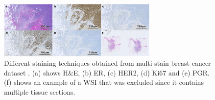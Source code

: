 \begin{figure}[h]
  \centering
  \includegraphics[width=0.7\textwidth]{Cap2/Figures/staining_comparison.png}
  \caption{Different staining techniques obtained from multi-stain
    breast cancer dataset \cite{WeitzEtAl2023}. (a) shows H\&E, (b)
    ER, (c) HER2, (d) Ki67 and (e) PGR. (f) shows an example of a
    WSI that was excluded since it contains multiple tissue
  sections.}
  \label{fig:hist_staining}
\end{figure}